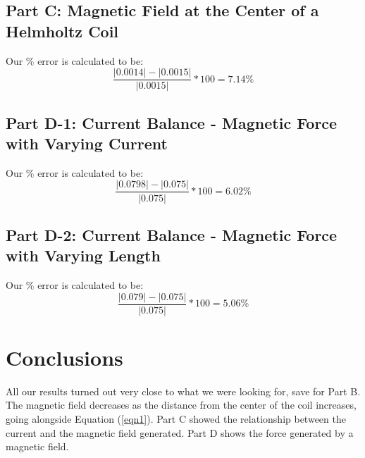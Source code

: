 \documentclass[titlepage]{article}
\begin{document}
\subsection{Part C: Magnetic Field at the Center of a Helmholtz Coil}\label{sub:part_c_magnetic_field_at_the_center_of_a_helmholtz_coil-dor}
Our \% error is calculated to be:
\[
	\frac{|0.0014| - |0.0015|}{|0.0015|} * 100 = 7.14\%
\]

\subsection{Part D-1: Current Balance - Magnetic Force with Varying Current}\label{sub:part_d_1_current_balance_magnetic_force_with_varying_current-dor}
Our \% error is calculated to be:
\[
	\frac{|0.0798| - |0.075|}{|0.075|} * 100 = 6.02\%
\]

\subsection{Part D-2: Current Balance - Magnetic Force with Varying Length}\label{sub:part_d_2_current_balance_magnetic_force_with_varying_length-dor}
Our \% error is calculated to be:
\[
	\frac{|0.079| - |0.075|}{|0.075|} * 100 = 5.06\%
\]

\section{Conclusions}\label{sec:conclusions}
All our results turned out very close to what we were looking for, save for Part B. The magnetic field decreases as the distance from the center of the coil increases, going alongside Equation (\ref{eqn1}). Part C showed the relationship between the current and the magnetic field generated. Part D shows the force generated by a magnetic field.
\end{document}
